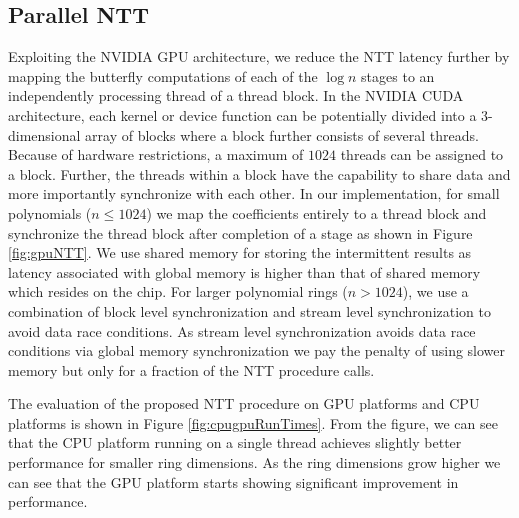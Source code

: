 \subsection{Parallel NTT}

Exploiting the NVIDIA GPU architecture, we reduce the NTT latency further by mapping the butterfly computations of each of the $\log{n}$ stages to an independently processing thread of a thread block. In the NVIDIA CUDA architecture, each kernel or device function can be potentially divided into a $3$-dimensional array of blocks where a block further consists of several threads. Because of hardware restrictions, a maximum of $1024$ threads can be assigned to a block. Further, the threads within a block have the capability to share data and more importantly synchronize with each other. In our implementation, for small polynomials ($n \leq 1024$) we map the coefficients entirely to a thread block and synchronize the thread block after completion of a stage as shown in Figure \ref{fig:gpuNTT}. We use shared memory for storing the intermittent results as latency associated with global memory is higher than that of shared memory which resides on the chip. For larger polynomial rings ($n>1024$), we use a combination of block level synchronization and  stream level synchronization to avoid data race conditions. As stream level synchronization avoids data race conditions via global memory synchronization we pay the penalty of using slower memory but only for a fraction of the NTT procedure calls.

The evaluation of the proposed NTT procedure on GPU platforms and CPU platforms is shown in Figure \ref{fig:cpugpuRunTimes}. From the figure, we can see that the CPU platform running on a single thread achieves slightly better performance for smaller ring dimensions. As the ring dimensions grow higher we can see that the GPU platform starts showing significant improvement in performance. 

